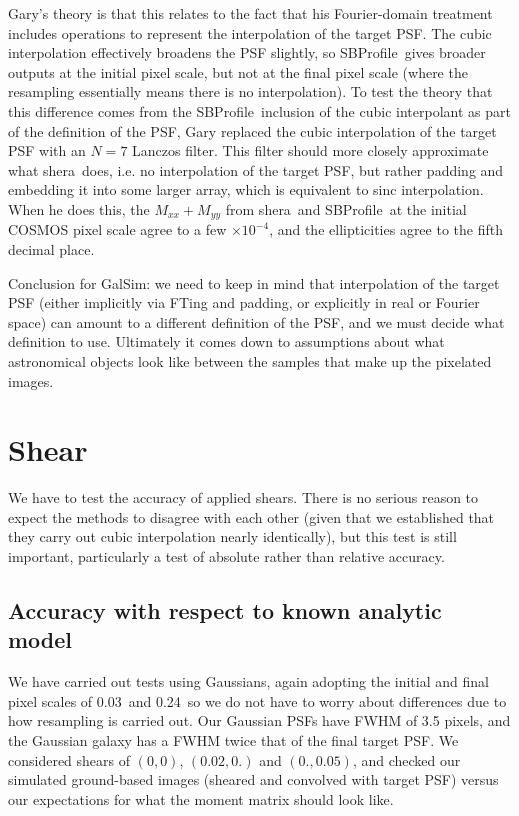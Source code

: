\documentclass[preprint]{aastex}
\newcommand{\shera}{{\sc shera}}
\newcommand{\sbp}{SBProfile}
\newcommand{\mxx}{\ensuremath{M_{xx}}}
\newcommand{\myy}{\ensuremath{M_{yy}}}
\begin{document}
Gary's theory is that
this relates to the fact that his Fourier-domain treatment includes
operations to represent the interpolation of the
target PSF.  The cubic interpolation effectively broadens the PSF
slightly, so \sbp\ gives broader outputs at the initial pixel scale,
but not at the final pixel scale (where the resampling essentially
means there is no interpolation).  To test the theory that
this difference comes from the \sbp\ inclusion of the cubic
interpolant as part of the definition of the PSF, Gary replaced the
cubic interpolation of the target PSF with an $N=7$ Lanczos filter.
This filter should more closely approximate what \shera\ does, i.e. no
interpolation of the target PSF, but rather padding and embedding it
into some larger array, which is equivalent to sinc interpolation.
When he does this, the $\mxx+\myy$ from \shera\ and \sbp\ at the
initial COSMOS pixel scale agree to a few $\times 10^{-4}$, and the
ellipticities agree to the fifth decimal place.  

Conclusion for GalSim: we need to keep in mind that interpolation of
the target PSF (either implicitly via FTing and padding, or explicitly
in real or Fourier space) can amount to a different definition of the
PSF, and we must decide what definition to use. Ultimately it comes down to assumptions about what
astronomical objects look like between the samples that make up the pixelated images.

\section{Shear}

We have to test the accuracy of applied shears.  There is no serious
reason to expect the methods to disagree with each other (given that
we established that they carry out cubic interpolation nearly
identically), but this test is still important, particularly a test of
absolute rather than relative accuracy.

\subsection{Accuracy with respect to known analytic model}

We have carried out tests using Gaussians, again adopting the initial and final pixel scales of
0.03\arcsec\ and 0.24\arcsec\ so we do not have to worry about differences due to how resampling is
carried out.  Our Gaussian PSFs have FWHM of 3.5 pixels, and the Gaussian galaxy has a FWHM twice
that of the final target PSF.  We considered shears of $(0, 0)$, $(0.02, 0.)$ and $(0., 0.05)$, and
checked our simulated ground-based images (sheared and convolved with target PSF) versus our
expectations for what the moment matrix should look like.
\end{document}
